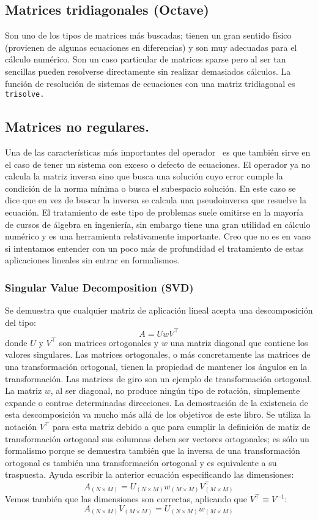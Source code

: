 \subsection{Matrices tridiagonales (Octave)}

Son uno de los tipos de matrices más buscadas; tienen un gran sentido
físico (provienen de algunas ecuaciones en diferencias) y son muy
adecuadas para el cálculo numérico. Son un caso particular de matrices
sparse pero al ser tan sencillas pueden resolverse directamente sin
realizar demasiados cálculos. La función de resolución de sistemas
de ecuaciones con una matriz tridiagonal es \texttt{trisolve.}


\subsection{Matrices no regulares.}

Una de las características más importantes del operador \
es que también sirve en el caso de tener un sistema con exceso o defecto
de ecuaciones. El operador ya no calcula la matriz inversa sino que
busca una solución cuyo error cumple la condición de la norma mínima
o busca el subespacio solución. En este caso se dice que en vez de
buscar la inversa se calcula una pseudoinversa que resuelve la ecuación.
El tratamiento de este tipo de problemas suele omitirse en la mayoría
de cursos de álgebra en ingeniería, sin embargo tiene una gran utilidad
en cálculo numérico y es una herramienta relativamente importante.
Creo que no es en vano si intentamos entender con un poco más de profundidad
el tratamiento de estas aplicaciones lineales sin entrar en formalismos.


\subsubsection{Singular Value Decomposition (SVD)}

Se demuestra que cualquier matriz de aplicación lineal acepta una
descomposición del tipo:\[ A=UwV^{\top}\] donde $U$ y $V^{\top}$ son
matrices ortogonales y $w$ una matriz diagonal que contiene los
valores singulares. Las matrices ortogonales, o más concretamente las
matrices de una transformación ortogonal, tienen la propiedad de
mantener los ángulos en la transformación.  Las matrices de giro son
un ejemplo de transformación ortogonal. La matriz $w$, al ser
diagonal, no produce ningún tipo de rotación, simplemente expande o
contrae determinadas direcciones. La demostración de la existencia de
esta descomposición va mucho más allá de los objetivos de este libro.
Se utiliza la notación $V^{\top}$ para esta matriz debido a que para
cumplir la definición de matiz de transformación ortogonal sus
columnas deben ser vectores ortogonales; es sólo un formalismo porque
se demuestra también que la inversa de una transformación ortogonal es
también una transformación ortogonal y es equivalente a su traspuesta.
Ayuda escribir la anterior ecuación especificando las dimensiones:
$$
A_{(N\times M)}=U_{(N\times M)}w_{(M\times M)}V_{(M\times M)}^{\top}$$
Vemos también que las dimensiones son correctas, aplicando que
$V^{\top}\equiv V^{-1}$:
$$ A_{(N\times M)}V_{(M\times M)}=U_{(N\times
  M)}w_{(M\times M)}$$


